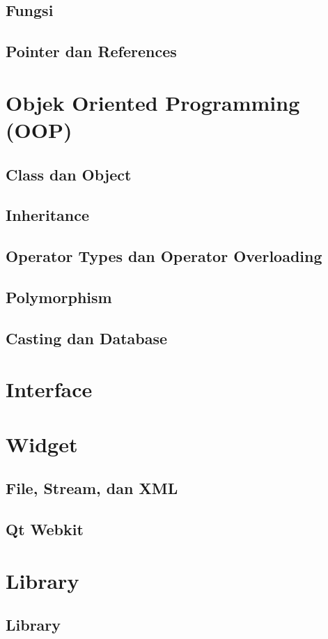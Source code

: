 \documentclass[11pt,b5paper,oneside,titlepage]{book}
\begin{document}
	\chapter{Fungsi}
	
	
	\chapter{Pointer dan References}\label{pointer-dan-references}
	
	\part{Objek Oriented Programming (OOP)}
	\chapter{Class dan Object}\label{class-dan-object}
	
	
	\chapter{Inheritance}\label{inheritance}
	
	
	\chapter{Operator Types dan Operator
		Overloading}\label{operator-types-dan-operator-overloading}
	
	
	\chapter{Polymorphism}\label{polymorphism}
	
	
	\chapter{Casting dan Database}\label{casting-dan-database}
	
	
	\part{Interface}
	
	\part{Widget}
	
	\chapter{File, Stream, dan XML}\label{file-stream-dan-xml}
		
		
		\chapter{Qt Webkit}
		
	\part{Library}
	\chapter{Library}
	
	
	\backmatter
	
	
	\printindex
\end{document}

